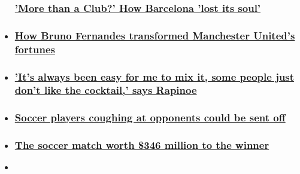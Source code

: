 \begin{itemize}
{  \subsubsection{\texorpdfstring{\href{/2020/08/07/football/barcelona-napoli-champions-league-lionel-messi-spt-intl-cmd/index.html}{'More
  than a Club?' How Barcelona 'lost its
  soul'}}{'More than a Club?' How Barcelona 'lost its soul'}}\label{more-than-a-club-how-barcelona-lost-its-soul}}
\item
  \hypertarget{how-bruno-fernandes-transformed-manchester-uniteds-fortunes}{%
  \subsubsection{\texorpdfstring{\href{/2020/08/04/football/manchester-united-bruno-fernandes-europa-league-cmd-spt-intl/index.html}{How
  Bruno Fernandes transformed Manchester United's
  fortunes}}{How Bruno Fernandes transformed Manchester United's fortunes}}\label{how-bruno-fernandes-transformed-manchester-uniteds-fortunes}}
\item
  \hypertarget{its-always-been-easy-for-me-to-mix-it-some-people-just-dont-like-the-cocktail-says-rapinoe}{%
  \subsubsection{\texorpdfstring{\href{/2020/08/05/football/megan-rapinoe-uswnt-activism-spt-intl/index.html}{'It's
  always been easy for me to mix it, some people just don't like the
  cocktail,' says
  Rapinoe}}{'It's always been easy for me to mix it, some people just don't like the cocktail,' says Rapinoe}}\label{its-always-been-easy-for-me-to-mix-it-some-people-just-dont-like-the-cocktail-says-rapinoe}}
\item
  \hypertarget{soccer-players-coughing-at-opponents-could-be-sent-off}{%
  \subsubsection{\texorpdfstring{\href{/2020/08/04/football/coughing-red-card-football-spt-intl-gbr/index.html}{Soccer
  players coughing at opponents could be sent
  off}}{Soccer players coughing at opponents could be sent off}}\label{soccer-players-coughing-at-opponents-could-be-sent-off}}
\item
  \hypertarget{the-soccer-match-worth-346-million-to-the-winner}{%
  \subsubsection{\texorpdfstring{\href{/2020/08/04/football/championship-playoff-fulham-brentford-premier-league-spt-intl/index.html}{The
  soccer match worth \$346 million to the
  winner}}{The soccer match worth \$346 million to the winner}}\label{the-soccer-match-worth-346-million-to-the-winner}}
\item
  \hypertarget{pierre-emerick-aubameyang-brace-helps-arsenal-lift-fa-cup-against-chelsea}{%
}
\end{itemize}
